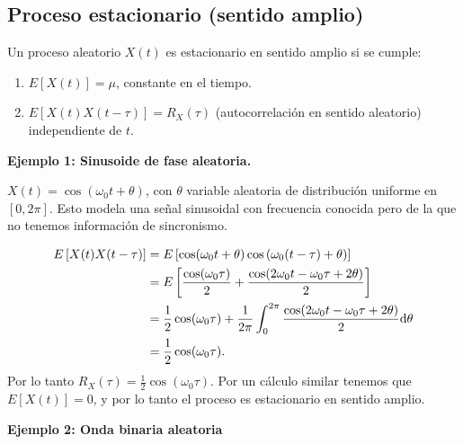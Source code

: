 \subsection*{Proceso estacionario (sentido amplio)}
Un proceso aleatorio $X(t)$ es estacionario en sentido amplio si
se cumple:
\begin{enumerate}
    \item $E\left[X(t)\right]=\mu$, constante en el tiempo.
    \item $E\left[X(t)X(t-\tau)\right]=R_X(\tau)$ (autocorrelación en sentido aleatorio) independiente de $t$.
\end{enumerate}

{\bf Ejemplo 1: Sinusoide de fase aleatoria.}


$X(t)=\cos(\omega_0t+\theta)$, con $\theta$ variable aleatoria de
distribución uniforme en $[0,2\pi]$. Esto modela una señal
sinusoidal con frecuencia conocida pero de la que no tenemos
información de sincronismo.

\begin{align*}
    E\left[X(t)X(t-\tau)\right]     & = E\left[\cos(\omega_0t+\theta)\cos\left(\omega_0(t-\tau)+\theta\right)\right]\\
                    & = E\left[\frac{\cos(\omega_0\tau)}{2}+\frac{\cos(2\omega_0t-\omega_0\tau+2\theta)}{2}\right]\\
                    & = \frac{1}{2}\cos(\omega_0\tau)+\frac{1}{2\pi}\int_0^{2\pi}\frac{\cos(2\omega_0t-\omega_0\tau+2\theta)}{2}\mathrm{d}\theta\\
                    & = \frac{1}{2}\cos(\omega_0\tau).
\end{align*}
Por lo tanto $R_X(\tau)=\frac{1}{2}\cos(\omega_0\tau)$. Por un
cálculo similar tenemos que $E\left[X(t)\right]=0$, y por lo tanto
el proceso es estacionario en sentido amplio.


{\bf Ejemplo 2: Onda binaria aleatoria}

